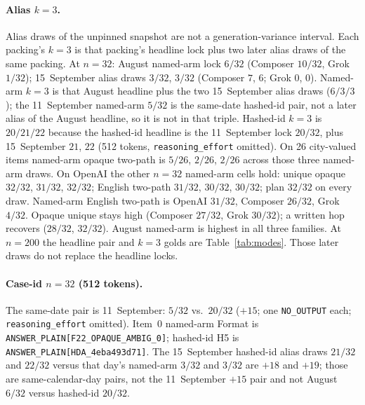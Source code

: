 \documentclass{article}
\begin{document}
\paragraph{Alias $k{=}3$.}
Alias draws of the unpinned snapshot are not a generation-variance
interval.
Each packing's $k{=}3$ is that packing's headline lock plus two later
alias draws of the same packing.
At $n{=}32$: August named-arm lock $6/32$ (Composer $10/32$, Grok $1/32$);
15~September alias draws $3/32$, $3/32$
(Composer $7$, $6$; Grok $0$, $0$).
Named-arm $k{=}3$ is that August headline plus the two 15~September alias draws
($6/3/3$); the 11~September named-arm $5/32$ is the same-date hashed-id
pair, not a later alias of the August headline, so it is not in that triple.
Hashed-id $k{=}3$ is $20/21/22$ because the hashed-id headline is the
11~September lock $20/32$, plus 15~September $21$, $22$
(512 tokens, \texttt{reasoning\_effort} omitted).
On 26 city-valued items named-arm opaque two-path is $5/26$, $2/26$,
$2/26$ across those three named-arm draws.
On OpenAI the other $n{=}32$ named-arm cells hold: unique opaque $32/32$,
$31/32$, $32/32$; English two-path $31/32$, $30/32$, $30/32$; plan
$32/32$ on every draw.
Named-arm English two-path is OpenAI $31/32$, Composer $26/32$, Grok
$4/32$.
Opaque unique stays high (Composer $27/32$, Grok $30/32$); a written hop
recovers ($28/32$, $32/32$).
August named-arm is highest in all three families.
At $n{=}200$ the headline pair and $k{=}3$ golds are Table~\ref{tab:modes}.
Those later draws do not replace the headline locks.

\paragraph{Case-id $n{=}32$ (512 tokens).}
The same-date pair is 11~September: $5/32$ vs.\ $20/32$ (${+}15$; one
\texttt{NO\_OUTPUT} each; \texttt{reasoning\_effort} omitted).
Item~0 named-arm Format is
\texttt{ANSWER\_PLAIN[F22\_OPAQUE\_AMBIG\_0]}; hashed-id H5 is
\texttt{ANSWER\_PLAIN[HDA\_4eba493d71]}.
The 15~September hashed-id alias draws $21/32$ and $22/32$ versus that
day's named-arm $3/32$ and $3/32$ are ${+}18$ and ${+}19$; those are
same-calendar-day pairs, not the 11~September ${+}15$ pair and not
August $6/32$ versus hashed-id $20/32$.
\end{document}
